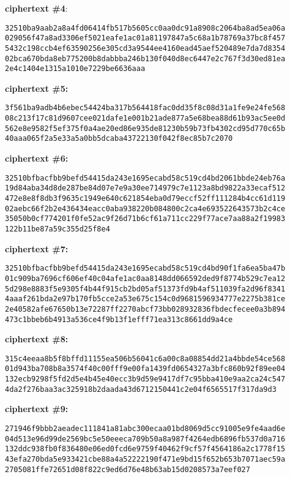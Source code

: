 \documentclass[a4paper,12pt]{article}
\begin{document}
\textbf{ciphertext \#4}:
\begin{verbatim}
32510ba9aab2a8a4fd06414fb517b5605cc0aa0dc91a8908c2064ba8ad5ea06a
029056f47a8ad3306ef5021eafe1ac01a81197847a5c68a1b78769a37bc8f457
5432c198ccb4ef63590256e305cd3a9544ee4160ead45aef520489e7da7d8354
02bca670bda8eb775200b8dabbba246b130f040d8ec6447e2c767f3d30ed81ea
2e4c1404e1315a1010e7229be6636aaa
\end{verbatim}

\textbf{ciphertext \#5:}
\begin{verbatim}
3f561ba9adb4b6ebec54424ba317b564418fac0dd35f8c08d31a1fe9e24fe568
08c213f17c81d9607cee021dafe1e001b21ade877a5e68bea88d61b93ac5ee0d
562e8e9582f5ef375f0a4ae20ed86e935de81230b59b73fb4302cd95d770c65b
40aaa065f2a5e33a5a0bb5dcaba43722130f042f8ec85b7c2070
\end{verbatim}

\textbf{ciphertext \#6:}
\begin{verbatim}
32510bfbacfbb9befd54415da243e1695ecabd58c519cd4bd2061bbde24eb76a
19d84aba34d8de287be84d07e7e9a30ee714979c7e1123a8bd9822a33ecaf512
472e8e8f8db3f9635c1949e640c621854eba0d79eccf52ff111284b4cc61d119
02aebc66f2b2e436434eacc0aba938220b084800c2ca4e693522643573b2c4ce
35050b0cf774201f0fe52ac9f26d71b6cf61a711cc229f77ace7aa88a2f19983
122b11be87a59c355d25f8e4
\end{verbatim}

\textbf{ciphertext \#7:}
\begin{verbatim}
32510bfbacfbb9befd54415da243e1695ecabd58c519cd4bd90f1fa6ea5ba47b
01c909ba7696cf606ef40c04afe1ac0aa8148dd066592ded9f8774b529c7ea12
5d298e8883f5e9305f4b44f915cb2bd05af51373fd9b4af511039fa2d96f8341
4aaaf261bda2e97b170fb5cce2a53e675c154c0d9681596934777e2275b381ce
2e40582afe67650b13e72287ff2270abcf73bb028932836fbdecfecee0a3b894
473c1bbeb6b4913a536ce4f9b13f1efff71ea313c8661dd9a4ce
\end{verbatim}

\textbf{ciphertext \#8:}
\begin{verbatim}
315c4eeaa8b5f8bffd11155ea506b56041c6a00c8a08854dd21a4bbde54ce568
01d943ba708b8a3574f40c00fff9e00fa1439fd0654327a3bfc860b92f89ee04
132ecb9298f5fd2d5e4b45e40ecc3b9d59e9417df7c95bba410e9aa2ca24c547
4da2f276baa3ac325918b2daada43d6712150441c2e04f6565517f317da9d3
\end{verbatim}

\textbf{ciphertext \#9:}
\begin{verbatim}
271946f9bbb2aeadec111841a81abc300ecaa01bd8069d5cc91005e9fe4aad6e
04d513e96d99de2569bc5e50eeeca709b50a8a987f4264edb6896fb537d0a716
132ddc938fb0f836480e06ed0fcd6e9759f40462f9cf57f4564186a2c1778f15
43efa270bda5e933421cbe88a4a52222190f471e9bd15f652b653b7071aec59a
2705081ffe72651d08f822c9ed6d76e48b63ab15d0208573a7eef027
\end{verbatim}
\end{document}
